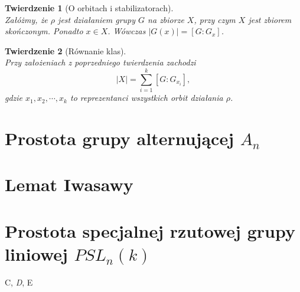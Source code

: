 \documentclass[licencjacka]{pracamgr}
\newtheorem{thh}{Twierdzenie}[section]
\begin{document}
\begin{thh}[O orbitach i stabilizatorach] $ $\\
	Załóżmy, że $\rho$ jest działaniem grupy $G$ na zbiorze $X$, przy czym $X$ jest zbiorem skończonym.
	Ponadto $x \in X$. Wówczas $|G(x)| = [G : G_x]$.
\end{thh}

\begin{thh}[Równanie klas] $ $\\
	Przy założeniach z poprzedniego twierdzenia zachodzi
	$$ |X| = \sum_{i=1}^k [G : G_{x_i}] ,$$
	gdzie $x_1, x_2, \cdots, x_k$ to reprezentanci wszystkich orbit działania $\rho$.
\end{thh}





\chapter{Prostota grupy alternującej $A_n$}

\chapter{Lemat Iwasawy}

\chapter{Prostota specjalnej rzutowej grupy liniowej $PSL_n(k)$}


\begin{thebibliography}{99}

 C, \textit{D}, E


\end{thebibliography}
\end{document}
